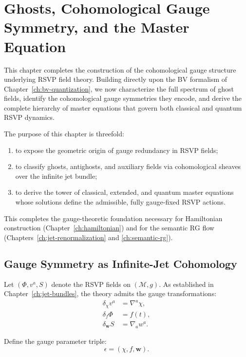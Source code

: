 \chapter{Ghosts, Cohomological Gauge Symmetry, and the Master Equation}
\label{ch:ghosts-cohomology}

This chapter completes the construction of the cohomological gauge structure
underlying RSVP field theory.  
Building directly upon the BV formalism of Chapter~\ref{ch:bv-quantization},
we now characterize the full spectrum of ghost fields, identify the
cohomological gauge symmetries they encode, and derive the complete hierarchy
of master equations that govern both classical and quantum RSVP dynamics.

The purpose of this chapter is threefold:

\begin{enumerate}
\item to expose the geometric origin of gauge redundancy in RSVP fields;
\item to classify ghosts, antighosts, and auxiliary fields via cohomological
      sheaves over the infinite jet bundle;
\item to derive the tower of classical, extended, and quantum master equations
      whose solutions define the admissible, fully gauge-fixed RSVP actions.
\end{enumerate}

This completes the gauge-theoretic foundation necessary for Hamiltonian
construction (Chapter~\ref{ch:hamiltonian}) and for the semantic RG flow
(Chapters~\ref{ch:jet-renormalization} and \ref{ch:semantic-rg}).  

\section{Gauge Symmetry as Infinite-Jet Cohomology}

Let $(\Phi, v^a, S)$ denote the RSVP fields on $(\mathcal{M}, g)$.
As established in Chapter~\ref{ch:jet-bundles}, the theory admits the gauge
transformations:
\begin{align}
  \delta_\chi v^a &= \nabla^a \chi, \\
  \delta_f \Phi   &= f(t), \\
  \delta_{\mathbf{w}} S &= \nabla_a w^a.
\end{align}

Define the gauge parameter triple:
\[
\epsilon = (\chi, f, \mathbf{w}).
\]

